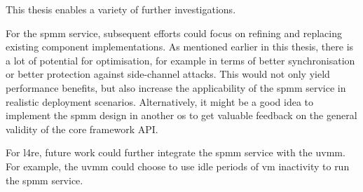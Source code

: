 This thesis enables a variety of further investigations.

For the \ac{spmm} service, subsequent efforts could focus on refining and replacing existing component implementations.
As mentioned earlier in this thesis, there is a lot of potential for optimisation, for example in terms of better synchronisation or better protection against side-channel attacks.
This would not only yield performance benefits, but also increase the applicability of the \ac{spmm} service in realistic deployment scenarios.
Alternatively, it might be a good idea to implement the \ac{spmm} design in another \ac{os} to get valuable feedback on the general validity of the core framework API.

For \ac{l4re}, future work could further integrate the \ac{spmm} service with the \ac{uvmm}.
For example, the \ac{uvmm} could choose to use idle periods of \ac{vm} inactivity to run the \ac{spmm} service.
